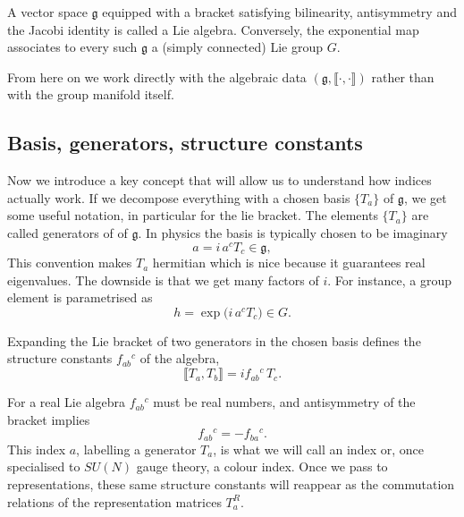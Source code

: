 \begin{definition}
A vector space $\mathfrak g$ equipped with a bracket satisfying
bilinearity, antisymmetry and the Jacobi identity is called a Lie
algebra. Conversely, the exponential map associates to every such
$\mathfrak g$ a (simply connected) Lie group $G$.
\end{definition}

From here on we work directly with the algebraic data
$(\mathfrak g, \llbracket \cdot,\cdot\rrbracket)$ rather than with the
group manifold itself.

\subsection{Basis, generators, structure constants}

Now we introduce a key concept that will allow us to understand how
indices actually work. If we decompose everything with a chosen basis $\{T_a\}$ of $\mathfrak g$, we get some useful notation, in particular for the lie bracket. The elements $\{T_a\}$ are called generators of of $\mathfrak g$. In physics the basis is typically chosen to be imaginary
\begin{equation}
    a = i\, a^c T_c \in \mathfrak{g},
\end{equation}
This convention makes $T_a$ hermitian which is nice because it guarantees real eigenvalues. The downside is that we get many factors of $i$. For instance, a group element is parametrised as
\begin{equation}
    h = \exp\!\big(i\, a^c T_c\big) \in G.
\end{equation}

\begin{definition}
Expanding the Lie bracket of two generators in the chosen basis
defines the structure constants $f_{ab}{}^{c}$ of the algebra,
\begin{equation}
    \llbracket T_a, T_b \rrbracket = i f_{ab}{}^{c} \, T_c.
\end{equation}
\end{definition}

For a real Lie algebra $f_{ab}{}^{c}$ must be real numbers, and
antisymmetry of the bracket implies
\begin{equation}
    f_{ab}{}^{c} = -f_{ba}{}^{c}.
\end{equation}
This index $a$, labelling a generator $T_a$, is what we will call an
index or, once specialised to $SU(N)$ gauge theory, a colour index.
Once we pass to representations, these same structure constants will
reappear as the commutation relations of the representation matrices
$T_a^R$.

